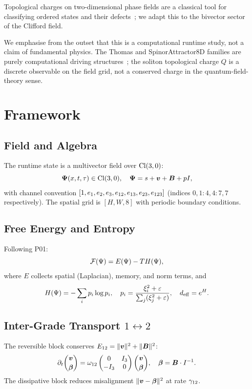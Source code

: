 \documentclass[11pt,a4paper]{article}
\begin{document}
Topological charges on two-dimensional phase fields are a classical tool
for classifying ordered states and their defects~\cite{mermin1979};
we adapt this to the bivector sector of the Clifford field.

We emphasise from the outset that this is a computational runtime study,
not a claim of fundamental physics.
The Thomas and SpinorAttractor8D families are purely computational
driving structures~\cite{thomas1999,zenodo_p00};
the soliton topological charge $Q$ is a discrete observable on the field
grid, not a conserved charge in the quantum-field-theory sense.

\section{Framework}

\subsection{Field and Algebra}

The runtime state is a multivector field over $\mathrm{Cl}(3,0)$:
\[
  \boldsymbol{\Psi}(x,t,\tau) \in \mathrm{Cl}(3,0),
  \quad
  \boldsymbol{\Psi} = s + \boldsymbol{v} + \boldsymbol{B} + pI,
\]
with channel convention
$[1, e_{1}, e_{2}, e_{3}, e_{12}, e_{13}, e_{23}, e_{123}]$
(indices $0,1{:}4,4{:}7,7$ respectively).
The spatial grid is $[H, W, 8]$ with periodic boundary conditions.

\subsection{Free Energy and Entropy}

Following P01:
\[
  \mathcal{F}(\Psi) = E(\Psi) - T H(\Psi),
\]
where $E$ collects spatial (Laplacian), memory, and norm terms, and
\[
  H(\Psi) = -\sum_i p_i \log p_i,
  \quad
  p_i = \frac{\xi_i^2 + \varepsilon}{\sum_j (\xi_j^2 + \varepsilon)},
  \quad
  d_{\mathrm{eff}} = e^H.
\]

\subsection{Inter-Grade Transport $1 \leftrightarrow 2$}

The reversible block conserves $E_{12} = \|\boldsymbol{v}\|^2 + \|\boldsymbol{B}\|^2$:
\[
  \partial_t \binom{\boldsymbol{v}}{\boldsymbol{\beta}}
  = \omega_{12}
    \begin{pmatrix}0 & I_3 \\ -I_3 & 0\end{pmatrix}
    \binom{\boldsymbol{v}}{\boldsymbol{\beta}},
  \quad \boldsymbol{\beta} = \boldsymbol{B} \cdot I^{-1}.
\]
The dissipative block reduces misalignment $\|\boldsymbol{v} - \boldsymbol{\beta}\|^2$
at rate $\gamma_{12}$.
\end{document}
